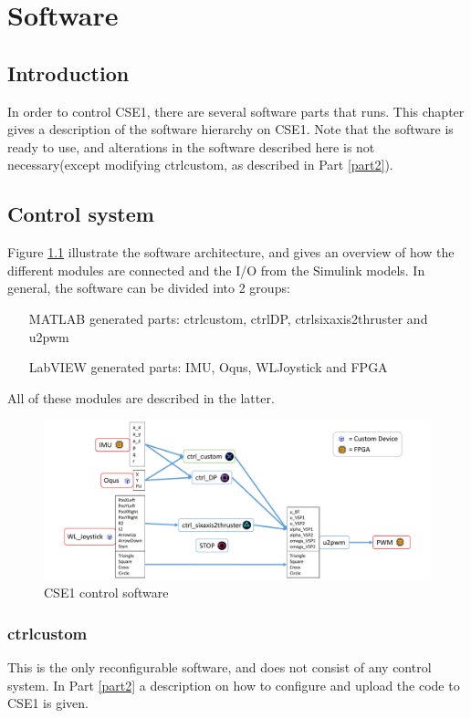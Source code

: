 \chapter{Software}
\section{Introduction}
In order to control CSE1, there are several software parts that runs. This chapter gives a description of the software hierarchy on CSE1. Note that the software is ready to use, and alterations in the software described here is not necessary(except modifying ctrl\textunderscore custom, as described in Part \ref{part2}).
\section{Control system}
Figure \ref{fig: CSE1 software} illustrate the software architecture, and gives an overview of how the different modules are connected and the I/O from the Simulink models. In general, the software can be divided into 2 groups: 
\begin{itemize}
	\item[MATLAB] generated parts: ctrl\textunderscore custom, ctrl\textunderscore DP, ctrl\textunderscore sixaxis2thruster and u2pwm
	\item[LabVIEW] generated parts: IMU, Oqus, WL\textunderscore Joystick and FPGA
\end{itemize}
All of these modules are described in the latter. 
\begin{figure}[htb!]
	\centering
	\includegraphics[width=\textwidth]{fig/software_overview.pdf}
	\caption{CSE1 control software}
	\label{fig: CSE1 software}
\end{figure}

\subsection{ctrl\textunderscore custom}
This is the only reconfigurable software, and does not consist of any control system. In Part \ref{part2} a description on how to configure and upload the code to CSE1 is given. 
